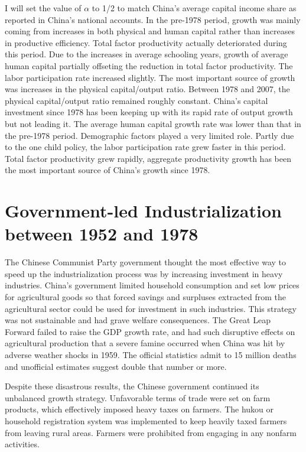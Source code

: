 \documentclass{article}
\begin{document}
    I will set the value of $\alpha$ to 1/2 to match China’s average capital income share as reported in China’s national accounts. In the pre-1978 period, growth was mainly coming from increases in both physical and human capital rather than increases in productive efficiency. Total factor productivity actually deteriorated during this period. Due to the increases in average schooling years, growth of average human capital partially offseting the reduction in total factor productivity. The labor participation rate increased slightly. The most important source of growth was increases in the physical capital/output ratio. Between 1978 and 2007, the physical capital/output ratio remained roughly constant. China’s  capital investment since 1978 has been keeping up with its rapid rate of output growth but not leading it. The average human capital growth rate was lower than that in the pre-1978 period. Demographic factors played a very limited role. Partly due to the one child policy, the labor participation rate grew faster in this period. Total factor productivity grew rapidly, aggregate productivity growth has been the most important source of China’s growth since 1978.
    
    \section*{Government-led Industrialization between 1952 and 1978}
    The Chinese Communist Party government thought the most effective way to speed up the industrialization process was by increasing investment in heavy industries. China’s government limited household consumption and set low prices for agricultural goods so that forced savings and surpluses extracted from the agricultural sector could be used for investment in such industries. This strategy was not sustainable and had grave welfare consequences. The Great Leap Forward failed to raise the GDP growth rate, and had such disruptive effects on agricultural production that a severe famine occurred when China was hit by adverse weather shocks in 1959. The official statistics admit to 15 million deaths and unofficial estimates suggest double that number or more.

    Despite these disastrous results, the Chinese government continued its unbalanced growth strategy. Unfavorable terms of trade were set on farm products, which effectively imposed heavy taxes on farmers. The hukou or household registration system was implemented to keep heavily taxed farmers from leaving rural areas. Farmers were prohibited from engaging in any nonfarm activities. 
\end{document}
